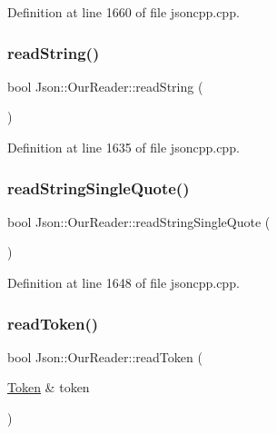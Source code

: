 Definition at line 1660 of file jsoncpp.\+cpp.

\hypertarget{class_json_1_1_our_reader_a5d39b12671499ec5975f3bbc84b7d438}{}\label{class_json_1_1_our_reader_a5d39b12671499ec5975f3bbc84b7d438} 
\subsubsection{\texorpdfstring{read\+String()}{readString()}}
{\footnotesize\ttfamily bool Json\+::\+Our\+Reader\+::read\+String (\begin{DoxyParamCaption}{ }\end{DoxyParamCaption})\hspace{0.3cm}{\ttfamily [private]}}



Definition at line 1635 of file jsoncpp.\+cpp.

\hypertarget{class_json_1_1_our_reader_ac78592defdc333faf56c6d0908758da3}{}\label{class_json_1_1_our_reader_ac78592defdc333faf56c6d0908758da3} 
\subsubsection{\texorpdfstring{read\+String\+Single\+Quote()}{readStringSingleQuote()}}
{\footnotesize\ttfamily bool Json\+::\+Our\+Reader\+::read\+String\+Single\+Quote (\begin{DoxyParamCaption}{ }\end{DoxyParamCaption})\hspace{0.3cm}{\ttfamily [private]}}



Definition at line 1648 of file jsoncpp.\+cpp.

\hypertarget{class_json_1_1_our_reader_a0d1e66da47fe2e85f5033c59326dfdc3}{}\label{class_json_1_1_our_reader_a0d1e66da47fe2e85f5033c59326dfdc3} 
\subsubsection{\texorpdfstring{read\+Token()}{readToken()}}
{\footnotesize\ttfamily bool Json\+::\+Our\+Reader\+::read\+Token (\begin{DoxyParamCaption}\item[{\hyperlink{class_json_1_1_our_reader_1_1_token}{Token} \&}]{token }\end{DoxyParamCaption})\hspace{0.3cm}{\ttfamily [private]}}



